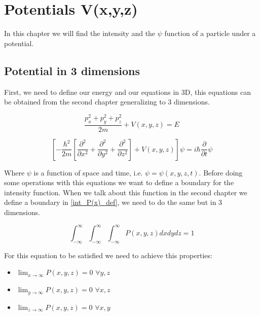 

\chapter{Potentials V(x,y,z)}

In this chapter we will find the intensity and the $\psi$ function of a particle under a potential. 

\section{Potential in 3 dimensions}

First, we need to define our energy and our equations in 3D, this equations can be obtained from the second chapter generalizing to 3 dimensions.

\begin{equation}
    \label{3.1}
    \frac{p_x^2+p_y^2+p_z^2}{2m}+V(x,y,z) = E
\end{equation}

\begin{equation}
    \label{3.2}
    \left[ -\frac{\hbar^2}{2m} \left[\frac{\partial^2}{\partial x^2}+\frac{\partial^2}{\partial y^2}+\frac{\partial^2}{\partial z^2}  \right] +V(x,y,z) \right] \psi = i\hbar \frac{\partial}{\partial t}\psi
\end{equation}

Where $\psi$ is a function of space and time, i.e. $\psi = \psi(x,y,z,t)$. Before doing some operations with this equations we want to define a boundary for the intensity function. When we talk about this function in the second chapter we define a boundary in \ref{int_P(x)_def}, we need to do the same but in 3 dimensions. 

\begin{equation}
    \label{3.3}
    \int_{-\infty}^{\infty}\int_{-\infty}^{\infty}\int_{-\infty}^{\infty}P(x,y,z)dxdydz = 1
\end{equation}

For this equation to be satisfied we need to achieve this properties:

\begin{itemize}
    \item $\lim_{x\to\infty}P(x,y,z) = 0$ $\forall y,z$
    \item $\lim_{y\to\infty}P(x,y,z) = 0$ $\forall x,z$ 
    \item $\lim_{z\to\infty}P(x,y,z) = 0$ $\forall x,y$ 
\end{itemize}

